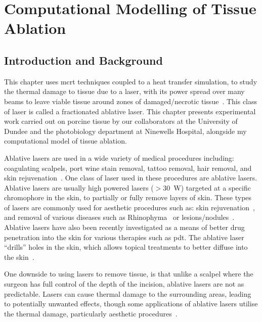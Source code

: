 \chapter{Computational Modelling of Tissue Ablation}
\label{chap:ablation}
\section{Introduction and Background}
\label{sec:intro}

This chapter uses \gls*{mcrt} techniques coupled to a heat transfer simulation, to study the thermal damage to tissue due to a laser, with its power spread over many beams to leave viable tissue around zones of damaged/necrotic tissue~\cite{manstein2004fractional}. This class of laser is called a fractionated ablative laser. This chapter presents experimental work carried out on porcine tissue by our collaborators at the University of Dundee and the photobiology department at Ninewells Hospital, alongside my computational model of tissue ablation.

\medskip

Ablative lasers are used in a wide variety of medical procedures including: coagulating scalpels, port wine stain removal, tattoo removal, hair removal, and skin rejuvenation~\cite{amini2010ultrafast, tan1989treatment,kuperman2001laser,liew2002laser,hardaway2002nonablative}.
One class of laser used in these procedures are ablative lasers. Ablative lasers are usually high powered lasers ($>$30~W) targeted at a specific chromophore in the skin, to partially or fully remove layers of skin. These types of lasers are commonly used for aesthetic procedures such as: skin rejuvenation~\cite{hardaway2002nonablative}, and removal of various diseases such as Rhinophyma~\cite{shapshay1980removal} or lesions/nodules~\cite{valcavi2010percutaneous}. Ablative lasers have also been recently investigated as a means of better drug penetration into the skin for various therapies such as \gls*{pdt}. The ablative laser ``drills'' holes in the skin, which allows topical treatments to better diffuse into the skin~\cite{haedersdal2010fractional}.

One downside to using lasers to remove tissue, is that unlike a scalpel where the surgeon has full control of the depth of the incision, ablative lasers are not as predictable. Lasers can cause thermal damage to the surrounding areas, leading to potentially  unwanted effects, though some applications of ablative lasers utilise the thermal damage, particularly aesthetic procedures~\cite{alexiades2008spectrum}.

